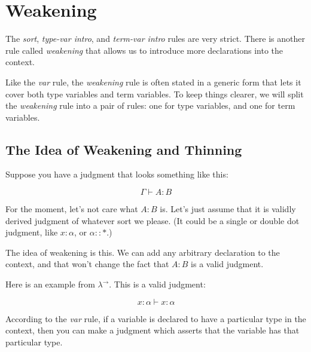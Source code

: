 \documentclass{book}
\numberwithin{equation}{chapter}
\begin{document}
\chapter{Weakening}

The \textit{sort}, \textit{type-var intro}, and \textit{term-var intro} rules are very strict. There is another rule called \textit{weakening} that allows us to introduce more declarations into the context.

Like the \textit{var} rule, the \textit{weakening} rule is often stated in a generic form that lets it cover both type variables and term variables. To keep things clearer, we will split the \textit{weakening} rule into a pair of rules: one for type variables, and one for term variables.



\section{The Idea of Weakening and Thinning}

Suppose you have a judgment that looks something like this:

\begin{equation}
\Gamma \vdash A : B
\end{equation}

\noindent
For the moment, let's not care what $A : B$ is. Let's just assume that it is validly derived judgment of whatever sort we please. (It could be a single or double dot judgment, like $x : \alpha$, or $\alpha :: \ast$.)

The idea of weakening is this. We can add any arbitrary declaration to the context, and that won't change the fact that $A : B$ is a valid judgment.

Here is an example from $\lambda^{\rightarrow}$. This is a valid judgment:

\begin{equation}
x : \alpha \vdash x : \alpha
\end{equation}

\noindent
According to the \textit{var} rule, if a variable is declared to have a particular type in the context, then you can make a judgment which asserts that the variable has that particular type.
\end{document}
